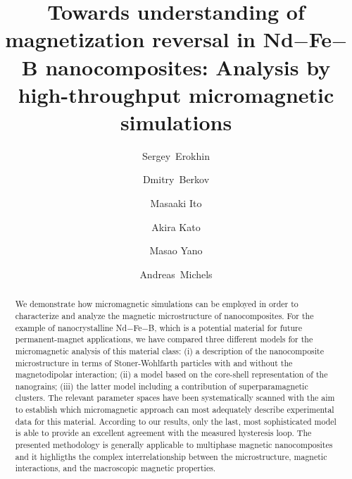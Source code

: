 \documentclass[prm,twocolumn,showkeys,preprintnumbers,amsmath,amssymb,superscriptaddress,aps,10pt]{revtex4-1}
\begin{document}
\title{Towards understanding of magnetization reversal in Nd$-$Fe$-$B nanocomposites: Analysis by high-throughput micromagnetic simulations}

\author{Sergey~Erokhin}
\author{Dmitry~Berkov}
\author{Masaaki Ito}
\author{Akira Kato}
\author{Masao Yano}
\author{Andreas~Michels}


\begin{abstract}
We demonstrate how micromagnetic simulations can be employed in order to characterize and analyze the magnetic microstructure of nanocomposites. For the example of nanocrystalline Nd$-$Fe$-$B, which is a potential material for future permanent-magnet applications, we have compared three different models for the micromagnetic analysis of this material class: (i) a description of the nanocomposite microstructure in terms of Stoner-Wohlfarth particles with and without the magnetodipolar interaction; (ii) a model based on the core-shell representation of the nanograins; (iii) the latter model including a contribution of superparamagnetic clusters. The relevant parameter spaces have been systematically scanned with the aim to establish which micromagnetic approach can most adequately describe experimental data for this material. According to our results, only the last, most sophisticated model is able to provide an excellent agreement with the measured hysteresis loop. The presented methodology is generally applicable to multiphase magnetic nanocomposites and it highligths the complex interrelationship between the microstructure, magnetic interactions, and the macroscopic magnetic properties.
\end{abstract}

\maketitle\
\end{document}
